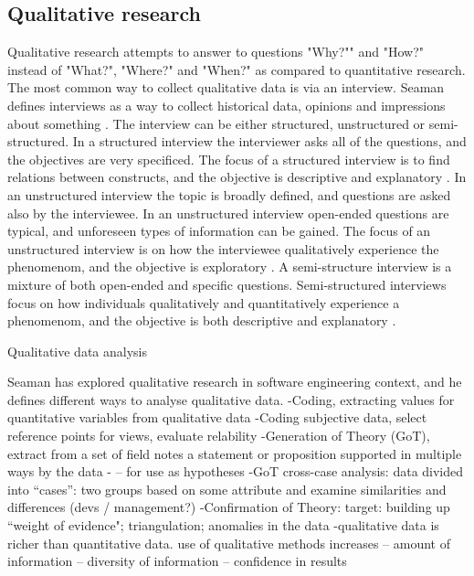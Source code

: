\documentclass[english]{tktltiki2}
\theoremstyle{definition}
\theoremstyle{remark}
\begin{document}
\subsection{Qualitative research}
Qualitative research attempts to answer to questions "Why?"" and "How?" instead of "What?", "Where?" and "When?" as compared to quantitative research. The most common way to collect qualitative data is via an interview. Seaman defines interviews as a way to collect historical data, opinions and impressions about something \cite{seaman1999qualitative}. The interview can be either structured, unstructured or semi-structured. In a structured interview the interviewer asks all of the questions, and the objectives are very specificed. The focus of a structured interview is to find relations between constructs, and the objective is descriptive and explanatory \cite{runeson2009guidelines}. In an unstructured interview the topic is broadly defined, and questions are asked also by the interviewee. In an unstructured interview open-ended questions are typical, and unforeseen types of information can be gained. The focus of an unstructured interview is on how the interviewee qualitatively experience the phenomenom, and the objective is exploratory \cite{runeson2009guidelines}. A semi-structure interview is a mixture of both open-ended and specific questions. Semi-structured interviews focus on how individuals qualitatively and quantitatively experience a phenomenom, and the objective is both descriptive and explanatory \cite{runeson2009guidelines}.

Qualitative data analysis \cite{robson2002real} \

Seaman has explored qualitative research in software engineering context, and he defines different ways to analyse qualitative data. \cite{seaman1999qualitative} 
-Coding, extracting values for quantitative variables from qualitative data
-Coding subjective data, select reference points for views, evaluate relability
-Generation of Theory (GoT), extract from a set of field notes a statement or proposition supported in multiple ways by the data - – for use as hypotheses
-GoT cross-case analysis: data divided into “cases”: two groups based on some attribute and examine similarities and differences (devs / management?)
-Confirmation of Theory: target: building up “weight of evidence"; triangulation; anomalies in the data
-qualitative data is richer than quantitative data. use of qualitative methods increases
– amount of information
– diversity of information
– confidence in results
\end{document}
